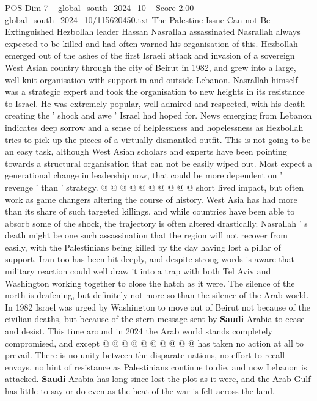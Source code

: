 \begin{textsample}{POS Dim 7 – global\_south\_2024\_10 – Score 2.00 – global\_south\_2024\_10/115620450.txt}  \label{ex:f7_pos_206}
The Palestine Issue Can not Be Extinguished Hezbollah leader Hassan Nasrallah assassinated Nasrallah always expected to be killed and had often warned his organisation of this.
Hezbollah emerged out of the ashes of the first Israeli attack and invasion of a sovereign West Asian country through the city of Beirut in 1982, and grew into a large, well knit organisation with support in and outside Lebanon.
Nasrallah himself was a strategic expert and took the organisation to new heights in its resistance to Israel.
He was extremely popular, well admired and respected, with his death creating the ' shock and awe ' Israel had hoped for.
News emerging from Lebanon indicates deep sorrow and a sense of helplessness and hopelessness as Hezbollah tries to pick up the pieces of a virtually dismantled outfit.
This is not going to be an easy task, although West Asian scholars and experts have been pointing towards a structural organisation that can not be easily wiped out.
Most expect a generational change in leadership now, that could be more dependent on ' revenge ' than ' strategy. @ @ @ @ @ @ @ @ @ @ short lived impact, but often work as game changers altering the course of history.
West Asia has had more than its share of such targeted killings, and while countries have been able to absorb some of the shock, the trajectory is often altered drastically.
Nasrallah ' s death might be one such assassination that the region will not recover from easily, with the Palestinians being killed by the day having lost a pillar of support.
Iran too has been hit deeply, and despite strong words is aware that military reaction could well draw it into a trap with both Tel Aviv and Washington working together to close the hatch as it were.
The silence of the north is deafening, but definitely not more so than the silence of the Arab world.
In 1982 Israel was urged by Washington to move out of Beirut not because of the civilian deaths, but because of the stern message sent by \textbf{Saudi} Arabia to cease and desist.
This time around in 2024 the Arab world stands completely compromised, and except @ @ @ @ @ @ @ @ @ @ has taken no action at all to prevail.
There is no unity between the disparate nations, no effort to recall envoys, no hint of resistance as Palestinians continue to die, and now Lebanon is attacked. \textbf{Saudi} Arabia has long since lost the plot as it were, and the Arab Gulf has little to say or do even as the heat of the war is felt across the land.

\end{textsample}
